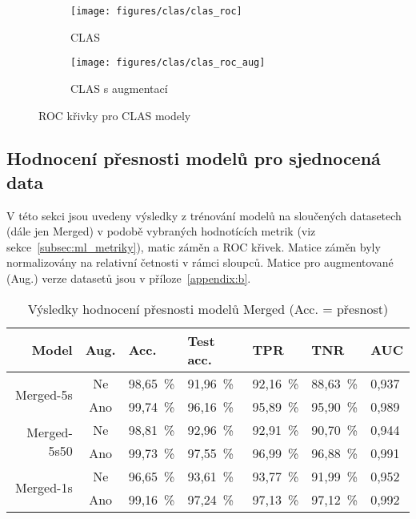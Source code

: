 \begin{figure}[!htb]
    \centering
    \begin{subfigure}[h]{0.42\linewidth}
        \texttt{[image: figures/clas/clas\_roc]}
        \caption{CLAS}
    \end{subfigure}
    \hspace{0.1cm}
    \begin{subfigure}[h]{0.42\linewidth}
        \texttt{[image: figures/clas/clas\_roc\_aug]}
        \caption{CLAS s augmentací}
    \end{subfigure}
    \caption{ROC křivky pro CLAS modely}
    \label{fig:results_roc_clas}
\end{figure}

\subsection{Hodnocení přesnosti modelů pro sjednocená data}
\label{subsec:merged_models}
V této sekci jsou uvedeny výsledky z trénování modelů na sloučených datasetech
(dále jen Merged) v podobě vybraných hodnotících metrik (viz
sekce~\ref{subsec:ml_metriky}), matic záměn a ROC křivek. Matice záměn byly
normalizovány na relativní četnosti v rámci sloupců. Matice pro augmentované
(Aug.) verze datasetů jsou v příloze~\ref{appendix:b}.

\begin{table}[h]
    \small
    \centering
    \caption{Výsledky hodnocení přesnosti modelů Merged (Acc. = přesnost)}
    \begin{tabular*}{\linewidth}{@{\extracolsep{\fill}} r|c|lllll @{}}
        \toprule
        Model                        & Aug. & Acc.     & Test acc. & TPR      & TNR      & AUC   \\ \midrule
        \multirow{2}{*}{Merged-5s}   & Ne   & 98,65~\% & 91,96~\%  & 92,16~\% & 88,63~\% & 0,937 \\
        & Ano  & 99,74~\% & 96,16~\%  & 95,89~\% & 95,90~\% & 0,989 \\ \midrule
        \multirow{2}{*}{Merged-5s50} & Ne   & 98,81~\% & 92,96~\%  & 92,91~\% & 90,70~\% & 0,944 \\
        & Ano  & 99,73~\% & 97,55~\%  & 96,99~\% & 96,88~\% & 0,991 \\ \midrule
        \multirow{2}{*}{Merged-1s}   & Ne   & 96,65~\% & 93,61~\%  & 93,77~\% & 91,99~\% & 0,952 \\
        & Ano  & 99,16~\% & 97,24~\%  & 97,13~\% & 97,12~\% & 0,992 \\
        \bottomrule
    \end{tabular*}
    \label{tab:merged}
\end{table}

